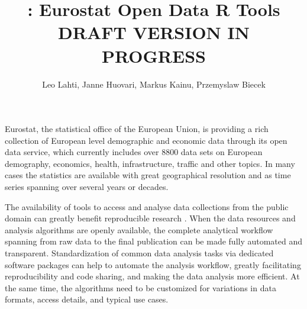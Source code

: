 \title{: Eurostat Open Data R Tools\\DRAFT VERSION IN PROGRESS}
\author{Leo Lahti, Janne Huovari, Markus Kainu, Przemyslaw Biecek}

\maketitle


Eurostat, the statistical office of the European Union, is providing a rich
collection of European level demographic and economic data through its
open data service, which currently includes over 8800 data sets on
European demography, economics, health, infrastructure, traffic and
other topics. In many cases the statistics are available with great
geographical resolution and as time series spanning over several years
or decades.

The availability of tools to access and analyse data collections from
the public domain can greatly benefit reproducible
research \citep{Gandrud13, Boettiger2015}. When the data resources and
analysis algorithms are openly available, the complete analytical
workflow spanning from raw data to the final publication can be made
fully automated and transparent. Standardization of common data
analysis tasks via dedicated software packages can help to automate
the analysis workflow, greatly facilitating reproducibility and code
sharing, and making the data analysis more efficient. At the same
time, the algorithms need to be customized for variations in data
formats, access details, and typical use cases.

